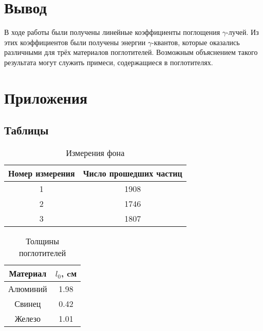 \documentclass[12pt, a4paper, reqno]{article}
\begin{document}
\section{Вывод}

    В ходе работы были получены линейные коэффициенты поглощения $\gamma$-лучей. Из этих
    коэффициентов были получены энергии $\gamma$-квантов, которые оказались различными для трёх
    материалов поглотителей. Возможным объяснением такого результата могут служить примеси,
    содержащиеся в поглотителях.

\newpage
\section{Приложения}

    \subsection{Таблицы}

        \begin{table}[H]
            \centering
            \caption{Измерения фона}
            \begin{tabular}{|c|c|}
                \hline
                Номер измерения & Число прошедших частиц \\ \hline\hline
                1               & 1908                   \\ \hline
                2               & 1746                   \\ \hline
                3               & 1807                   \\ \hline
            \end{tabular}
            \label{table:background}
        \end{table}

        \begin{table}[H]
            \centering
            \caption{Толщины поглотителей}
            \begin{tabular}{|c|c|}
                \hline
                Материал & $l_0$, cм \\ \hline\hline
                Алюминий & 1.98      \\ \hline
                Свинец   & 0.42      \\ \hline
                Железо   & 1.01      \\ \hline
            \end{tabular}
            \label{table:depth}
        \end{table}
\end{document}
